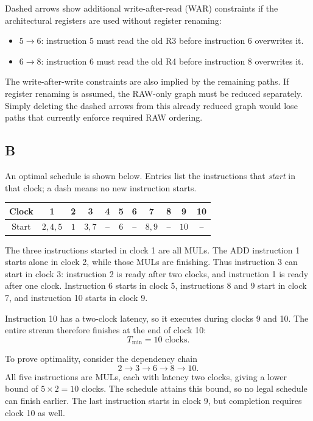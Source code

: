 \documentclass[letterpaper,12pt]{article}
\newenvironment{answer}{\par}{\par\medskip}
\begin{document}
\begin{answer}
Dashed arrows show additional write-after-read (WAR) constraints if the
architectural registers are used without register renaming:
\begin{itemize}
  \item $5\to6$: instruction 5 must read the old R3 before instruction 6
        overwrites it.
  \item $6\to8$: instruction 6 must read the old R4 before instruction 8
        overwrites it.
\end{itemize}
The write-after-write constraints are also implied by the remaining paths.
If register renaming is assumed, the RAW-only graph must be reduced
separately. Simply deleting the dashed arrows from this already reduced
graph would lose paths that currently enforce required RAW ordering.
\end{answer}

\clearpage
\subsection*{B}
\begin{answer}
An optimal schedule is shown below. Entries list the instructions that
\emph{start} in that clock; a dash means no new instruction starts.

\begin{center}
\begin{tabular}{c|*{10}{c}}
  Clock & 1 & 2 & 3 & 4 & 5 & 6 & 7 & 8 & 9 & 10 \\
  \hline
  Start & $2,4,5$ & $1$ & $3,7$ & -- & $6$ & -- & $8,9$ & -- & $10$ & --
\end{tabular}
\end{center}

The three instructions started in clock 1 are all MULs. The ADD instruction 1
starts alone in clock 2, while those MULs are finishing. Thus instruction 3
can start in clock 3: instruction 2 is ready after two clocks, and
instruction 1 is ready after one clock. Instruction 6 starts in clock 5,
instructions 8 and 9 start in clock 7, and instruction 10 starts in clock 9.

Instruction 10 has a two-clock latency, so it executes during clocks 9
and 10. The entire stream therefore finishes at the end of clock 10:
\[
  \boxed{T_{\min}=10\text{ clocks}}.
\]

To prove optimality, consider the dependency chain
\[
  2\longrightarrow3\longrightarrow6\longrightarrow8\longrightarrow10.
\]
All five instructions are MULs, each with latency two clocks, giving a
lower bound of $5\times2=10$ clocks. The schedule attains this bound,
so no legal schedule can finish earlier. The last instruction starts
in clock 9, but completion requires clock 10 as well.
\end{answer}
\end{document}
